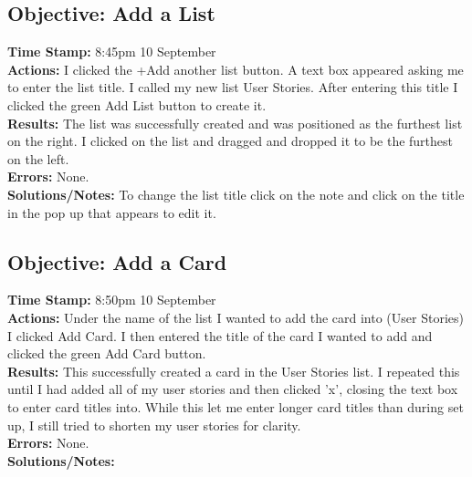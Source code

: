 \documentclass{article}
\begin{document}
\begin{FlushLeft}
\subsection{Objective: Add a List}
\textbf{Time Stamp:} 8:45pm 10 September\\
\textbf{Actions:} I clicked the +Add another list button. A text box appeared asking me to enter the list title. I called my new list User Stories. After entering this title I clicked the green Add List button to create it. \\
\textbf{Results:} The list was successfully created and was positioned as the furthest list on the right. I clicked on the list and dragged and dropped it to be the furthest on the left. \\
\textbf{Errors:} None.\\
\textbf{Solutions/Notes:} To change the list title click on the note and click on the title in the pop up that appears to edit it.\\

\subsection{Objective: Add a Card}
\textbf{Time Stamp:} 8:50pm 10 September\\
\textbf{Actions:} Under the name of the list I wanted to add the card into (User Stories) I clicked Add Card. I then entered the title of the card I wanted to add and clicked the green Add Card button.\\
\textbf{Results:} This successfully created a card in the User Stories list. I repeated this until I had added all of my user stories and then clicked 'x', closing the text box to enter card titles into. While this let me enter longer card titles than during set up, I still tried to shorten my user stories for clarity.\\
\textbf{Errors:} None.\\
\textbf{Solutions/Notes:}\\


\end{FlushLeft}
\end{document}
